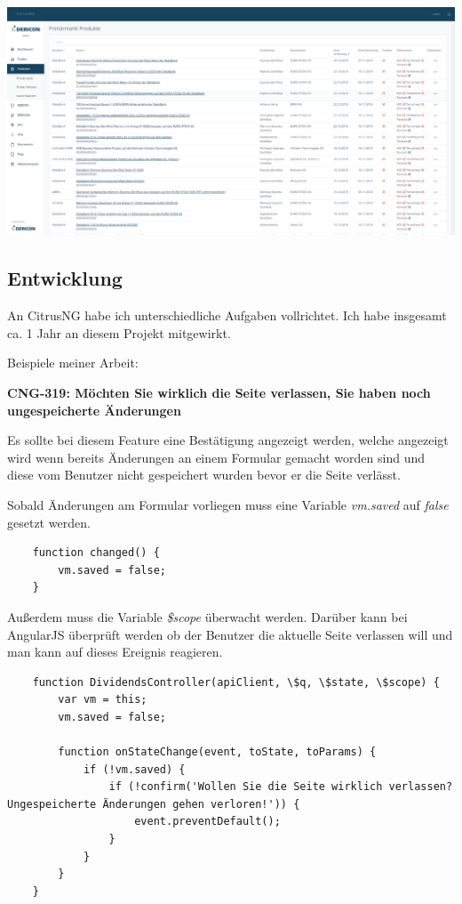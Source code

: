 \documentclass[chapterprefix=false, 12pt, a4paper, oneside, parskip=half, listof=totoc, bibliography=totoc, numbers=noendperiod]{scrbook}
\begin{document}
    \includegraphics[width=1.00\textwidth]{img/citrusng.png}

    \subsection{Entwicklung}

    An CitrusNG habe ich unterschiedliche Aufgaben vollrichtet. Ich habe insgesamt ca. 1 Jahr an diesem Projekt mitgewirkt.

    Beispiele meiner Arbeit:

    \textbf{CNG-319: Möchten Sie wirklich die Seite verlassen, Sie haben noch ungespeicherte Änderungen}

    Es sollte bei diesem Feature eine Bestätigung angezeigt werden, welche angezeigt wird wenn bereits Änderungen an einem Formular
    gemacht worden sind und diese vom Benutzer nicht gespeichert wurden bevor er die Seite verlässt.

    Sobald Änderungen am Formular vorliegen muss eine Variable \textit{vm.saved} auf \textit{false} gesetzt werden.

    \begin{verbatim}
    function changed() {
        vm.saved = false;
    }
    \end{verbatim}

    Außerdem muss die Variable \textit{\$scope} überwacht werden. Darüber kann bei AngularJS überprüft werden ob der
    Benutzer die aktuelle Seite verlassen will und man kann auf dieses Ereignis reagieren.

    \begin{verbatim}
    function DividendsController(apiClient, \$q, \$state, \$scope) {
        var vm = this;
        vm.saved = false;

        function onStateChange(event, toState, toParams) {
            if (!vm.saved) {
                if (!confirm('Wollen Sie die Seite wirklich verlassen? Ungespeicherte Änderungen gehen verloren!')) {
                    event.preventDefault();
                }
            }
        }
    }
    \end{verbatim}
\end{document}
